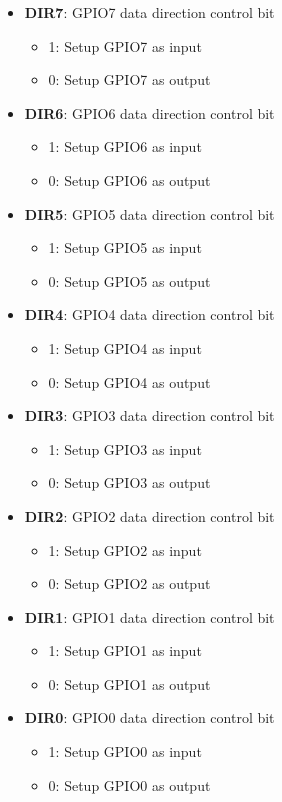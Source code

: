 \documentclass{article}
\begin{document}
		\begin{itemize}
			\item \textbf{DIR7}: GPIO7 data direction control bit
			\begin{itemize}
				\item 1: Setup GPIO7 as input
				\item 0: Setup GPIO7 as output
			\end{itemize}
			\item \textbf{DIR6}: GPIO6 data direction control bit
			\begin{itemize}
				\item 1: Setup GPIO6 as input
				\item 0: Setup GPIO6 as output
			\end{itemize}
			\item \textbf{DIR5}: GPIO5 data direction control bit
			\begin{itemize}
				\item 1: Setup GPIO5 as input
				\item 0: Setup GPIO5 as output
			\end{itemize}
			\item \textbf{DIR4}: GPIO4 data direction control bit
			\begin{itemize}
				\item 1: Setup GPIO4 as input
				\item 0: Setup GPIO4 as output
			\end{itemize}
			\item \textbf{DIR3}: GPIO3 data direction control bit
			\begin{itemize}
				\item 1: Setup GPIO3 as input
				\item 0: Setup GPIO3 as output
			\end{itemize}
			\item \textbf{DIR2}: GPIO2 data direction control bit
			\begin{itemize}
				\item 1: Setup GPIO2 as input
				\item 0: Setup GPIO2 as output
			\end{itemize}
			\item \textbf{DIR1}: GPIO1 data direction control bit
			\begin{itemize}
				\item 1: Setup GPIO1 as input
				\item 0: Setup GPIO1 as output
			\end{itemize}
			\item \textbf{DIR0}: GPIO0 data direction control bit
			\begin{itemize}
				\item 1: Setup GPIO0 as input
				\item 0: Setup GPIO0 as output
			\end{itemize}

		\end{itemize}
\end{document}
